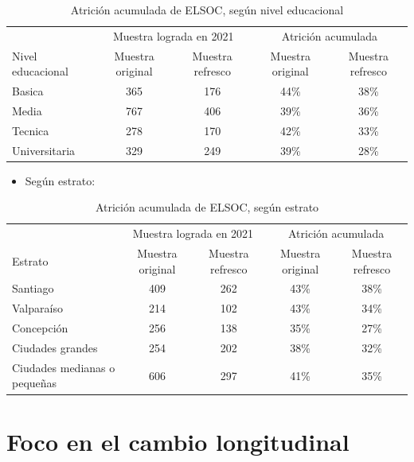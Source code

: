 \documentclass[
  12pt,
]{book}
\providecommand{\tightlist}{%
  \setlength{\itemsep}{0pt}\setlength{\parskip}{0pt}}
\begin{document}
\begin{table}

\caption{\label{tab:tabla-atricion-educ}Atrición acumulada de ELSOC, según nivel educacional}
\centering
\begin{tabular}[t]{l|c|c|c|c}
\hline
\multicolumn{1}{c|}{ } & \multicolumn{2}{c|}{Muestra lograda en 2021} & \multicolumn{2}{c}{Atrición acumulada} \\
\cline{2-3} \cline{4-5}
Nivel educacional & Muestra original & Muestra refresco & Muestra original & Muestra refresco\\
\hline
Basica & 365 & 176 & 44\% & 38\%\\
\hline
Media & 767 & 406 & 39\% & 36\%\\
\hline
Tecnica & 278 & 170 & 42\% & 33\%\\
\hline
Universitaria & 329 & 249 & 39\% & 28\%\\
\hline
\end{tabular}
\end{table}

\begin{itemize}
\tightlist
\item
  Según estrato:
\end{itemize}

\begin{table}

\caption{\label{tab:tabla-atricion-estrato}Atrición acumulada de ELSOC, según estrato}
\centering
\begin{tabular}[t]{l|c|c|c|c}
\hline
\multicolumn{1}{c|}{ } & \multicolumn{2}{c|}{Muestra lograda en 2021} & \multicolumn{2}{c}{Atrición acumulada} \\
\cline{2-3} \cline{4-5}
Estrato & Muestra original & Muestra refresco & Muestra original & Muestra refresco\\
\hline
Santiago & 409 & 262 & 43\% & 38\%\\
\hline
Valparaíso & 214 & 102 & 43\% & 34\%\\
\hline
Concepción & 256 & 138 & 35\% & 27\%\\
\hline
Ciudades
grandes & 254 & 202 & 38\% & 32\%\\
\hline
Ciudades medianas
o pequeñas & 606 & 297 & 41\% & 35\%\\
\hline
\end{tabular}
\end{table}

\hypertarget{foco-en-el-cambio-longitudinal}{%
\section{Foco en el cambio longitudinal}\label{foco-en-el-cambio-longitudinal}}
\end{document}
